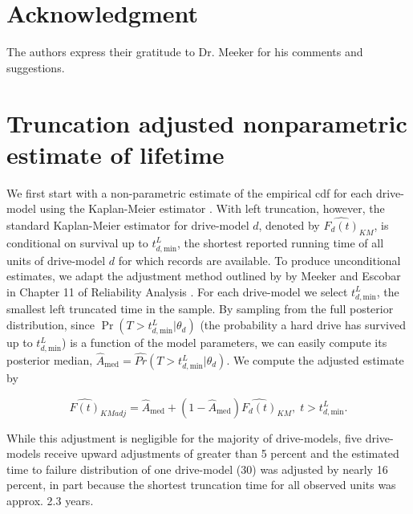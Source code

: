 \documentclass[12pt]{article}
\begin{document}
\section*{Acknowledgment}    
The authors express their gratitude to Dr. \hspace{-.5em} Meeker for his comments and suggestions.

\clearpage

\appendix
\section{Truncation adjusted nonparametric estimate of lifetime}
\label{sec:trunc-adj}
We first start with a non-parametric estimate of the empirical cdf for each drive-model using the Kaplan-Meier estimator
\cite{kaplan}.  With left truncation, however, the standard Kaplan-Meier estimator for drive-model $d$, denoted by
$\widehat{F_d(t)}_{KM}$, is conditional on survival up to
$t_{d,\text{min}}^L$, the shortest reported running time of all units
of drive-model $d$ for which records are available. To produce
unconditional estimates, we adapt the adjustment method outlined by by Meeker and Escobar  in Chapter 11 of Reliability Analysis \cite{meeker}.  For each drive-model we select
$t_{d,\text{min}}^L$, the smallest left truncated time in the sample.
By sampling from the full posterior distribution, since
$\Pr(T>t_{d,\text{min}}^L|\theta_d)$ (the probability a hard drive has
survived up to $t_{d,\text{min}}^L$) is a function of the model
parameters, we can easily compute its posterior median,
$\widehat{A}_{\text{med}} = \widehat{Pr}(T>t_{d,\text{min}}^L|\theta_d)$. We compute the adjusted estimate by

$$\widehat{F(t)}_{KMadj} = \widehat{A}_{\text{med}} + \left(1 - \widehat{A}_{\text{med}}\right)\widehat{F_d(t)}_{KM},\; t>t_{d,\text{min}}^L.$$

While this adjustment is negligible for the majority of drive-models, five drive-models receive upward adjustments of greater than 5 percent and the estimated time to failure distribution of one drive-model (30) was adjusted by nearly 16 percent, in part because the shortest truncation time for all observed units was approx. 2.3 years.
\end{document}
